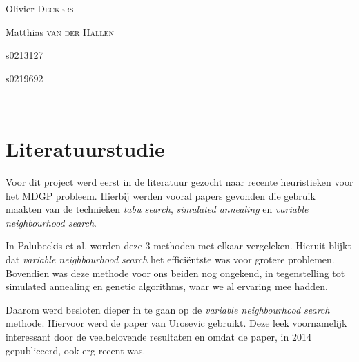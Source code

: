 \documentclass[pdftex,12pt,a4paper]{article}
\begin{document}
\begin{titlepage}
\begin{center}
\begin{minipage}{0.4\textwidth}
\begin{flushleft} \large
Olivier \textsc{Deckers} \\
\end{flushleft}
\begin{flushleft} \large
Matthias \textsc{van der Hallen} \\
\end{flushleft}
\end{minipage}
\begin{minipage}{0.4\textwidth}
\begin{flushright} \large
s0213127
\end{flushright}
\begin{flushright} \large
s0219692\\
\end{flushright}
\end{minipage}\\[1cm]

\end{center}

\end{titlepage}

\thispagestyle{empty}  
\setcounter{page}{0}
\newpage
\setcounter{page}{1}

\tableofcontents
\newpage

\section{Literatuurstudie}
Voor dit project werd eerst in de literatuur gezocht naar recente heuristieken voor het MDGP probleem. Hierbij werden vooral papers gevonden die gebruik maakten van de technieken \emph{tabu search}, \emph{simulated annealing} en \emph{variable neighbourhood search}.

In Palubeckis et al.\cite{Palubeckis} worden deze 3 methoden met elkaar vergeleken. Hieruit blijkt dat \emph{variable neighbourhood search} het effici\"entste was voor grotere problemen. Bovendien was deze methode voor ons beiden nog ongekend, in tegenstelling tot simulated annealing en genetic algorithms, waar we al ervaring mee hadden.

Daarom werd besloten dieper in te gaan op de \emph{variable neighbourhood search} methode. Hiervoor werd de paper van Urosevic\cite{Urosevic} gebruikt. Deze leek voornamelijk interessant door de veelbelovende resultaten en omdat de paper, in 2014 gepubliceerd, ook erg recent was. 
\end{document}
